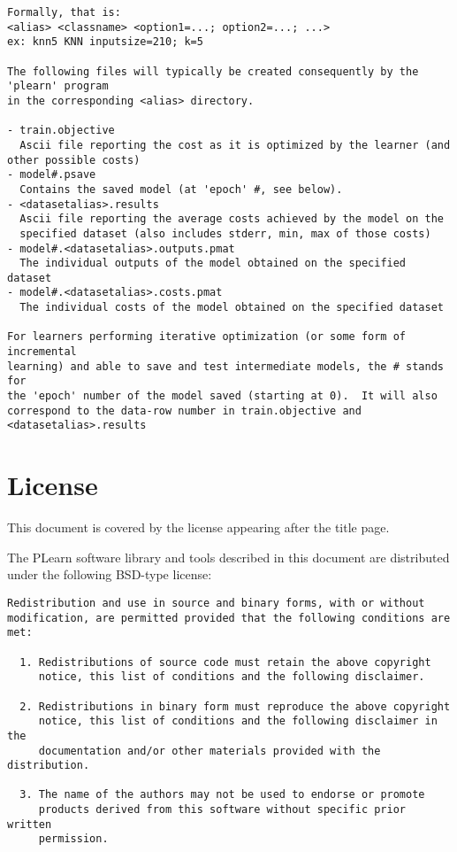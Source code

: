 \documentclass[11pt]{book}
\begin{document}
{\begin{verbatim}
Formally, that is: 
<alias> <classname> <option1=...; option2=...; ...>
ex: knn5 KNN inputsize=210; k=5 

The following files will typically be created consequently by the 'plearn' program
in the corresponding <alias> directory.

- train.objective   
  Ascii file reporting the cost as it is optimized by the learner (and other possible costs)
- model#.psave        
  Contains the saved model (at 'epoch' #, see below).
- <datasetalias>.results 
  Ascii file reporting the average costs achieved by the model on the 
  specified dataset (also includes stderr, min, max of those costs)
- model#.<datasetalias>.outputs.pmat 
  The individual outputs of the model obtained on the specified dataset
- model#.<datasetalias>.costs.pmat
  The individual costs of the model obtained on the specified dataset

For learners performing iterative optimization (or some form of incremental
learning) and able to save and test intermediate models, the # stands for
the 'epoch' number of the model saved (starting at 0).  It will also
correspond to the data-row number in train.objective and
<datasetalias>.results
\end{verbatim}


\chapter*{License}

This document is covered by the license appearing after the title page.

\vspace*{.5cm}

The PLearn software library and tools described in this document are
distributed under the following BSD-type license:

\begin{verbatim}
Redistribution and use in source and binary forms, with or without
modification, are permitted provided that the following conditions are met:
 
  1. Redistributions of source code must retain the above copyright
     notice, this list of conditions and the following disclaimer.
 
  2. Redistributions in binary form must reproduce the above copyright
     notice, this list of conditions and the following disclaimer in the
     documentation and/or other materials provided with the distribution.
 
  3. The name of the authors may not be used to endorse or promote
     products derived from this software without specific prior written
     permission.
 

\end{verbatim}}
\end{document}
